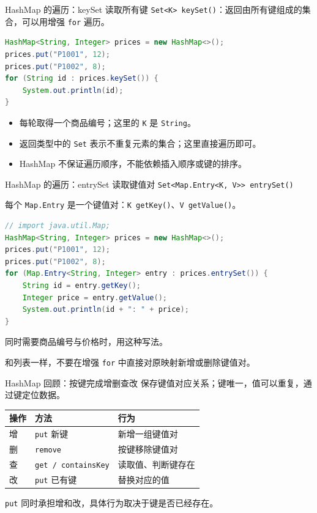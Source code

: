 \documentclass[aspectratio=169]{beamer}
\begin{document}
\begin{frame}[fragile]{HashMap 的遍历：keySet 读取所有键}
  \texttt{Set<K> keySet()}：返回由所有键组成的集合，可以用增强 \texttt{for} 遍历。
  \begin{lstlisting}[language=Java]
HashMap<String, Integer> prices = new HashMap<>();
prices.put("P1001", 12);
prices.put("P1002", 8);
for (String id : prices.keySet()) {
    System.out.println(id);
}
  \end{lstlisting}
  \begin{itemize}
    \item 每轮取得一个商品编号；这里的 \texttt{K} 是 \texttt{String}。
    \item 返回类型中的 \texttt{Set} 表示不重复元素的集合；这里直接遍历即可。
    \item \alert{HashMap 不保证遍历顺序}，不能依赖插入顺序或键的排序。
  \end{itemize}
\end{frame}

\begin{frame}[fragile]{HashMap 的遍历：entrySet 读取键值对}
  \texttt{Set<Map.Entry<K, V>> entrySet()}
  \par
  每个 \texttt{Map.Entry} 是一个键值对：\texttt{K getKey()}、\texttt{V getValue()}。
  \begin{lstlisting}[language=Java]
// import java.util.Map;
HashMap<String, Integer> prices = new HashMap<>();
prices.put("P1001", 12);
prices.put("P1002", 8);
for (Map.Entry<String, Integer> entry : prices.entrySet()) {
    String id = entry.getKey();
    Integer price = entry.getValue();
    System.out.println(id + ": " + price);
}
  \end{lstlisting}
  同时需要商品编号与价格时，用这种写法。
  \par\medskip
  和列表一样，不要在增强 \texttt{for} 中直接对原映射新增或删除键值对。
\end{frame}

\begin{frame}{HashMap 回顾：按键完成增删查改}
  保存键值对应关系；键唯一，值可以重复，通过键定位数据。
  \par\bigskip
  \begin{center}
    \renewcommand{\arraystretch}{1.4}
    \begin{tabular}{lll}
      \textbf{操作} & \textbf{方法} & \textbf{行为} \\
      \hline
      增 & \texttt{put} 新键 & 新增一组键值对 \\
      删 & \texttt{remove} & 按键移除键值对 \\
      查 & \texttt{get / containsKey} & 读取值、判断键存在 \\
      改 & \texttt{put} 已有键 & 替换对应的值 \\
    \end{tabular}
  \end{center}
  \bigskip
  \texttt{put} 同时承担\alert{增和改}，具体行为取决于键是否已经存在。
\end{frame}
\end{document}
